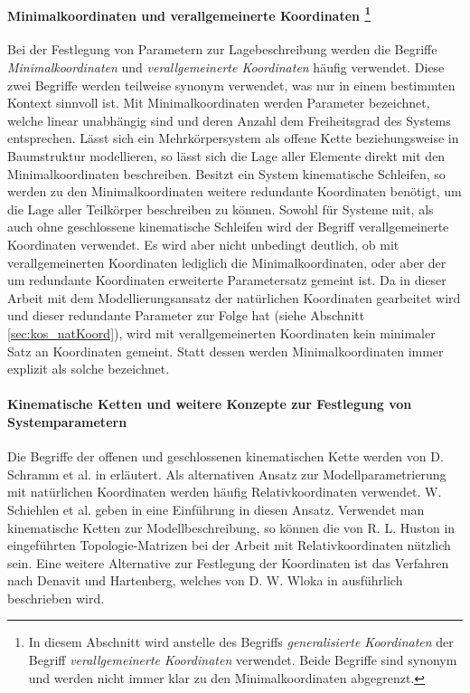   \paragraph{Minimalkoordinaten und verallgemeinerte Koordinaten \footnote{In diesem Abschnitt wird anstelle des Begriffs \textit{generalisierte Koordinaten} der Begriff \textit{verallgemeinerte Koordinaten} verwendet. Beide Begriffe sind synonym und werden nicht immer klar zu den Minimalkoordinaten abgegrenzt.}}
  Bei der Festlegung von Parametern zur Lagebeschreibung werden die Begriffe \textit{Minimalkoordinaten} und \textit{verallgemeinerte Koordinaten} h\"aufig verwendet. Diese zwei Begriffe werden teilweise synonym verwendet, was nur in einem bestimmten Kontext sinnvoll ist. \hfill \newline
  Mit Minimalkoordinaten werden Parameter bezeichnet, welche linear unabh\"angig sind und deren Anzahl dem Freiheitsgrad des Systems entsprechen. L\"asst sich ein Mehrk\"orpersystem als offene Kette beziehungsweise in Baumstruktur modellieren, so l\"asst sich die Lage aller Elemente direkt mit den Minimalkoordinaten beschreiben. \cite[S.27 f.]{Bestle2012} Besitzt ein System kinematische Schleifen, so werden zu den Minimalkoordinaten weitere redundante Koordinaten ben\"otigt, um die Lage aller Teilk\"orper beschreiben zu k\"onnen. \cite[S.63]{Schramm2010} Sowohl f\"ur Systeme mit, als auch ohne geschlossene kinematische Schleifen wird der Begriff verallgemeinerte Koordinaten verwendet.  Es wird aber nicht unbedingt deutlich, ob mit verallgemeinerten Koordinaten lediglich die Minimalkoordinaten, oder aber der um redundante Koordinaten erweiterte Parametersatz gemeint ist. \cite[S.133]{Woernle2011} Da in dieser Arbeit mit dem Modellierungsansatz der nat\"urlichen Koordinaten gearbeitet wird und dieser redundante Parameter zur Folge hat (siehe Abschnitt \ref{sec:kos_natKoord}), wird mit verallgemeinerten Koordinaten kein minimaler Satz an Koordinaten gemeint. Statt dessen werden Minimalkoordinaten immer explizit als solche bezeichnet.
  \paragraph*{Kinematische Ketten und weitere Konzepte zur Festlegung von Systemparametern}
  Die Begriffe der offenen und geschlossenen kinematischen Kette werden von D. Schramm et al. in \cite[S. 52 ff.]{Schramm2010} erl\"autert. \hfill \newline
  Als alternativen Ansatz zur Modellparametrierung mit nat\"urlichen Koordinaten werden h\"aufig Relativkoordinaten verwendet. W. Schiehlen et al. geben in \cite{Schiehlen2014} eine Einf\"uhrung in diesen Ansatz. Verwendet man kinematische Ketten zur Modellbeschreibung, so k\"onnen die von R. L. Huston in \cite{Huston1986} eingef\"uhrten Topologie-Matrizen bei der Arbeit mit Relativkoordinaten n\"utzlich sein. Eine weitere Alternative zur Festlegung der Koordinaten ist das Verfahren nach Denavit und Hartenberg, welches von D. W. Wloka in \cite[S. 111 ff.]{Wloka1992} ausf\"uhrlich beschrieben wird.

